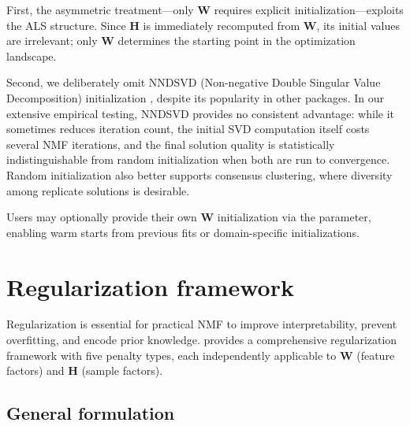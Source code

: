 \documentclass[article]{jss_modified}
\begin{document}
First, the asymmetric treatment---only $\mathbf{W}$ requires explicit 
initialization---exploits the ALS structure. Since $\mathbf{H}$ is immediately 
recomputed from $\mathbf{W}$, its initial values are irrelevant; only 
$\mathbf{W}$ determines the starting point in the optimization landscape.

Second, we deliberately omit NNDSVD (Non-negative Double Singular Value 
Decomposition) initialization \citep{Boutsidis2008}, despite its popularity in 
other packages. In our extensive empirical testing, NNDSVD provides no 
consistent advantage: while it sometimes reduces iteration count, the initial 
SVD computation itself costs several NMF iterations, and the final solution 
quality is statistically indistinguishable from random initialization when 
both are run to convergence. Random initialization also better supports 
consensus clustering, where diversity among replicate solutions is desirable.

Users may optionally provide their own $\mathbf{W}$ initialization via the 
 parameter, enabling warm starts from previous fits or 
domain-specific initializations.


\section{Regularization framework} \label{sec:regularization}

Regularization is essential for practical NMF to improve interpretability, 
prevent overfitting, and encode prior knowledge.  provides a 
comprehensive regularization framework with five penalty types, each 
independently applicable to $\mathbf{W}$ (feature factors) and $\mathbf{H}$ 
(sample factors).

\subsection{General formulation}
\end{document}
